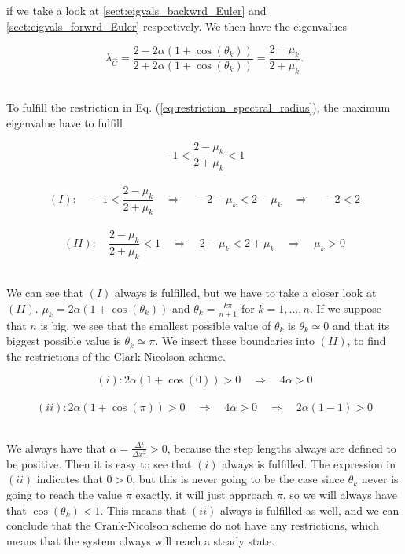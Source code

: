 \documentclass[12pt]{article}
\begin{document}
\begin{flushleft}
if we take a look at \ref{sect:eigvals_backwrd_Euler} and \ref{sect:eigvals_forwrd_Euler} respectively. We then have the eigenvalues

\vspace{5mm}
$$\lambda_{\hat{C}} = \frac{2-2\alpha(1+\cos(\theta_k))}{2+2\alpha(1+\cos(\theta_k))} = \frac{2-\mu_k}{2+\mu_k}.$$\\
\vspace{5mm}

To fulfill the restriction in Eq. (\ref{eq:restriction_spectral_radius}), the maximum eigenvalue have to fulfill 

\vspace{5mm}
$$-1 < \frac{2-\mu_k}{2+\mu_k} < 1$$\\
$$(I):\quad -1 < \frac{2-\mu_k}{2+\mu_k} \quad\Rightarrow\quad -2-\mu_k <  2-\mu_k \quad\Rightarrow\quad -2< 2$$\\
$$(II):\quad\frac{2-\mu_k}{2+\mu_k}< 1\quad\Rightarrow\quad 2-\mu_k < 2 + \mu_k \quad\Rightarrow\quad \mu_k > 0$$\\
\vspace{5mm}

We can see that $(I)$ always is fulfilled, but we have to take a closer look at $(II)$.
$\mu_k = 2\alpha(1+\cos(\theta_k))$ and $\theta_k = \frac{k\pi}{n+1}$ for $k=1,\dots ,n$. If we suppose that $n$ is big, we see that the smallest possible value of $\theta_k$ is $\theta_k \simeq 0$ and that its biggest possible value is $\theta_k \simeq \pi$. We insert these boundaries into $(II)$, to find the restrictions of the Clark-Nicolson scheme. 

\vspace{5mm}
$$(i): 2\alpha(1+\cos(0))>0 \quad\Rightarrow\quad 4\alpha > 0$$\\
$$(ii): 2\alpha(1+\cos(\pi))>0 \quad\Rightarrow\quad 4\alpha > 0 \quad\Rightarrow\quad 2\alpha(1-1) > 0$$\\
\vspace{5mm}

We always have that $\alpha = \frac{\Delta t}{\Delta x^2}>0$, because the step lengths always are defined to be positive. Then it is easy to see that $(i)$ always is fulfilled. The expression in $(ii)$
indicates that $0>0$, but this is never going to be the case since $\theta_k$ never is going to reach the value $\pi$ exactly, it will just approach $\pi$, so we will always have that $\cos(\theta_k)<1$. This means that $(ii)$ always is fulfilled as well, and we can conclude that the Crank-Nicolson scheme do not have any restrictions, which means that the system always will reach a steady state.


\end{flushleft}
\end{document}
